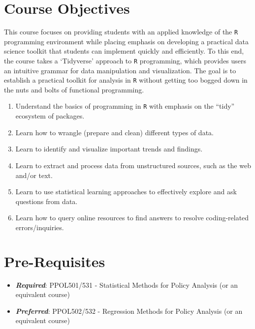 \documentclass[
  12pt,
]{article}
\providecommand{\tightlist}{%
  \setlength{\itemsep}{0pt}\setlength{\parskip}{0pt}}
\begin{document}
\hypertarget{course-objectives}{%
\section{Course Objectives}\label{course-objectives}}

This course focuses on providing students with an applied knowledge of
the \texttt{R} programming environment while placing emphasis on
developing a practical data science toolkit that students can implement
quickly and efficiently. To this end, the course takes a `Tidyverse'
approach to \texttt{R} programming, which provides users an intuitive
grammar for data manipulation and visualization. The goal is to
establish a practical toolkit for analysis in \texttt{R} without getting
too bogged down in the nuts and bolts of functional programming.

\begin{enumerate}
\def\labelenumi{\arabic{enumi}.}
\item
  Understand the basics of programming in \texttt{R} with emphasis on
  the ``tidy'' ecosystem of packages.
\item
  Learn how to wrangle (prepare and clean) different types of data.
\item
  Learn to identify and visualize important trends and findings.
\item
  Learn to extract and process data from unstructured sources, such as
  the web and/or text.
\item
  Learn to use statistical learning approaches to effectively explore
  and ask questions from data.
\item
  Learn how to query online resources to find answers to resolve
  coding-related errors/inquiries.
\end{enumerate}

\hypertarget{pre-requisites}{%
\section{Pre-Requisites}\label{pre-requisites}}

\begin{itemize}
\tightlist
\item
  \textbf{\emph{Required}}: PPOL501/531 - Statistical Methods for Policy
  Analysis (or an equivalent course)
\item
  \textbf{\emph{Preferred}}: PPOL502/532 - Regression Methods for Policy
  Analysis (or an equivalent course)
\end{itemize}
\end{document}
